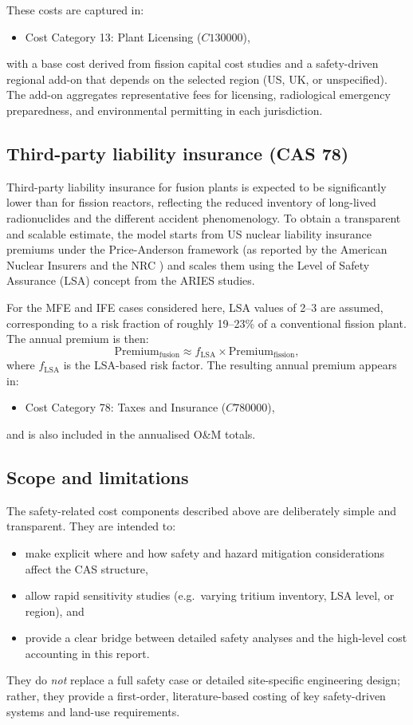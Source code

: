 These costs are captured in:
\begin{itemize}
  \item Cost Category 13: Plant Licensing (\(C130000\)),
\end{itemize}
with a base cost derived from fission capital cost studies
\cite{WorldNuclearEconomics} and a safety-driven regional add-on that
depends on the selected region (US, UK, or unspecified). The add-on
aggregates representative fees for licensing, radiological emergency
preparedness, and environmental permitting in each jurisdiction.

\subsection{Third-party liability insurance (CAS 78)}

Third-party liability insurance for fusion plants is expected to be
significantly lower than for fission reactors, reflecting the reduced
inventory of long-lived radionuclides and the different accident
phenomenology\cite{Holdren1991Safety,UKFusion2022}. To obtain a
transparent and scalable estimate, the model starts from US nuclear
liability insurance premiums under the Price-Anderson framework (as
reported by the American Nuclear Insurers and the NRC
\cite{NRCInsurance2024}) and scales them using the Level of Safety
Assurance (LSA) concept from the ARIES studies\cite{Miller2003ARIESST}.

For the MFE and IFE cases considered here, LSA values of 2--3 are
assumed, corresponding to a risk fraction of roughly 19--23\% of a
conventional fission plant. The annual premium is then:
\[
  \text{Premium}_\text{fusion} \approx f_\text{LSA} \times
  \text{Premium}_\text{fission},
\]
where \(f_\text{LSA}\) is the LSA-based risk factor. The resulting
annual premium appears in:
\begin{itemize}
  \item Cost Category 78: Taxes and Insurance (\(C780000\)),
\end{itemize}
and is also included in the annualised O\&M totals.

\subsection{Scope and limitations}

The safety-related cost components described above are deliberately
simple and transparent. They are intended to:
\begin{itemize}
  \item make explicit where and how safety and hazard mitigation
        considerations affect the CAS structure,
  \item allow rapid sensitivity studies (e.g.\ varying tritium
        inventory, LSA level, or region), and
  \item provide a clear bridge between detailed safety analyses and the
        high-level cost accounting in this report.
\end{itemize}
They do \emph{not} replace a full safety case or detailed site-specific
engineering design; rather, they provide a first-order, literature-based
costing of key safety-driven systems and land-use requirements.
\fi

